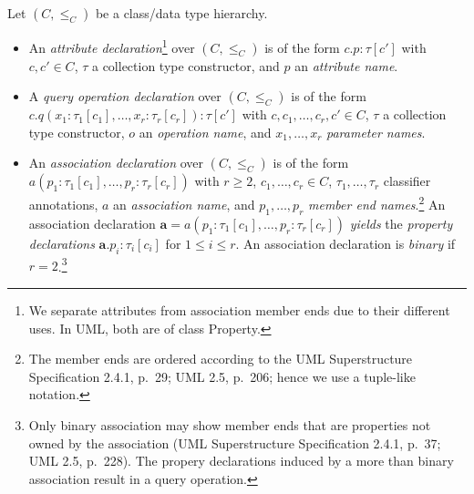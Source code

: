 \documentclass[10pt,fleqn,%
\ifpretendfinal
final%
\else
draft%
\fi,
]{scrreprt}
\newcommand{\uml}[1]{\textsf{#1}}
\begin{document}
\medskip
Let $(C, {\leq_C})$ be a class/data type hierarchy.
%
\begin{itemize}[label={--}, leftmargin=*]
  \item An \emph{attribute declaration}\footnote{We separate attributes
  from association member ends due to their different uses.  In UML,
  both are of class \uml{Property}.} over $(C, {\leq_C})$ is of the form
$c.p : \tau[c']$ with $c, c' \in C$, $\tau$ a collection type
constructor, and $p$ an \emph{attribute name}.

  \item A \emph{query operation declaration} over $(C, {\leq_C})$ is of
the form $c.q(x_1 : \tau_1[c_1], \dots, x_r : \tau_r[c_r]) : \tau[c']$
with $c, c_1,\ldots, c_r, c' \in C$, $\tau$ a collection type
constructor, $o$ an \emph{operation name}, and $x_1, \ldots, x_r$
\emph{parameter names}.

\item An \emph{association declaration} over $(C, {\leq_C})$ is of the
form $a(p_1 : \tau_1[c_1], \dots, p_r : \tau_r[c_r])$ with $r \geq 2$,
$c_1, \dots, c_r \in C$, $\tau_1, \ldots, \tau_r$ classifier
annotations, $a$ an \emph{association name}, and $p_1, \dots, p_r$
\emph{member end names}.\footnote{The member ends are ordered according
  to the UML Superstructure Specification 2.4.1, p.~29; UML 2.5, p.~206;
  hence we use a tuple-like notation.}  An association declaration
$\mathbf{a} = a(p_1 : \tau_1[c_1], \ldots, p_r : \tau_r[c_r])$
\emph{yields} the \emph{property declarations}
$\mathbf{a}.p_i : \tau_i[c_i]$ for $1 \leq i \leq r$.  An association
declaration is \emph{binary} if $r = 2$.\footnote{Only binary
  association may show member ends that are properties not owned by the
  association (UML Superstructure Specification 2.4.1, p.~37; UML 2.5,
  p.~228).  The propery declarations induced by a more than binary
  association result in a query operation.}


\end{itemize}
\end{document}
